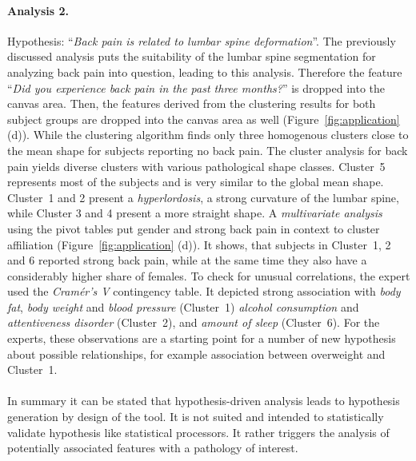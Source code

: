 \documentclass[journal]{style/vgtc} 			          %
\begin{document}
\paragraph{Analysis 2.}
Hypothesis: ``\emph{Back pain is related to lumbar spine deformation}''.
%
The previously discussed analysis puts the suitability of the lumbar spine segmentation for analyzing back pain into question, leading to this analysis.
%
Therefore the feature ``\emph{Did you experience back pain in the past three months?}'' is dropped into the canvas area. %
%
Then, the features derived from the clustering results for both subject groups are dropped into the canvas area as well (Figure~\ref{fig:application} (d)).
%
While the clustering algorithm finds only three homogenous clusters close to the mean shape for subjects reporting no back pain.
%
The cluster analysis for back pain yields diverse clusters with various pathological shape classes.
%
Cluster~5 represents most of the subjects and is very similar to the global mean shape.
%
Cluster~1 and 2 present a \emph{hyperlordosis}, a strong curvature of the lumbar spine, while Cluster 3 and 4 present a more straight shape.
%
A \emph{multivariate analysis} using the pivot tables put gender and strong back pain in context to cluster affiliation (Figure~\ref{fig:application} (d)). 
%
It shows, that subjects in Cluster~1, 2 and 6 reported strong back pain, while at the same time they also have a considerably higher share of females.
%
To check for unusual correlations, the expert used the \emph{Cram\'{e}r's V} contingency table.
%
It depicted strong association with \emph{body fat}, \emph{body weight} and \emph{blood pressure} (Cluster~1) \emph{alcohol consumption} and \emph{attentiveness disorder} (Cluster~2), and \emph{amount of sleep} (Cluster~6).
%
For the experts, these observations are a starting point for a number of new hypothesis about possible relationships, for example association between overweight and Cluster~1.
%
\\\\
In summary it can be stated that hypothesis-driven analysis leads to hypothesis generation by design of the tool.
%
It is not suited and intended to statistically validate hypothesis like statistical processors.
%
It rather triggers the analysis of potentially associated features with a pathology of interest.
%
\end{document}
